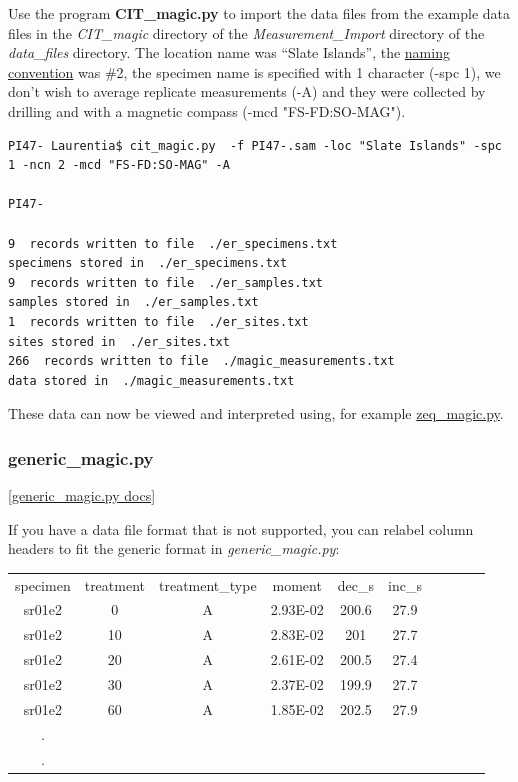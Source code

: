 \documentclass[11pt]{book}
\begin{document}
{{{{Use the program {\bf CIT\_magic.py} to import the data files from the example data files in the {\it CIT\_magic} directory of the {\it Measurement\_Import} directory of the {\it data\_files} directory.   The location name was ``Slate Islands'', the \href{#naming_schemes}{naming convention} was \#2, the specimen name is specified with 1 character (-spc 1), we don't wish to average replicate measurements (-A) and they were collected by drilling and with a magnetic compass (-mcd "FS-FD:SO-MAG").

\begin{verbatim}
PI47- Laurentia$ cit_magic.py  -f PI47-.sam -loc "Slate Islands" -spc 1 -ncn 2 -mcd "FS-FD:SO-MAG" -A

PI47-

9  records written to file  ./er_specimens.txt
specimens stored in  ./er_specimens.txt
9  records written to file  ./er_samples.txt
samples stored in  ./er_samples.txt
1  records written to file  ./er_sites.txt
sites stored in  ./er_sites.txt
266  records written to file  ./magic_measurements.txt
data stored in  ./magic_measurements.txt
\end{verbatim}

These data can now be viewed and interpreted using, for example \href{#zeq_magic.py}{zeq\_magic.py}.


\subsubsection{generic\_magic.py}
\href{https://github.com/PmagPy/PmagPy/blob/master/programs/generic_magic.py}{[generic\_magic.py docs]}

If you have a data file format that is not supported, you can relabel column headers to fit the generic format in {\it generic\_magic.py}:

\begin{tabular}{cccccccccc}
specimen &treatment &treatment\_type &moment &dec\_s &inc\_s \\
sr01e2 & 0 & A & 2.93E-02 & 200.6 & 27.9 \\
sr01e2 & 10 & A & 2.83E-02 & 201 & 27.7 \\
sr01e2 & 20 & A & 2.61E-02 & 200.5 & 27.4 \\
sr01e2 & 30 & A & 2.37E-02 & 199.9 & 27.7 \\
sr01e2 & 60 & A & 1.85E-02 & 202.5 & 27.9 \\
.\\
.\\
\end{tabular}

}}}}
\end{document}
